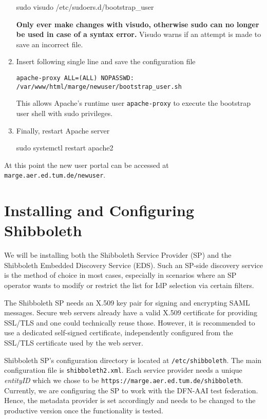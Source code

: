 \begin{enumerate}
\begin{terminal}
        sudo visudo /etc/sudoers.d/bootstrap_user
    \end{terminal}
    \textbf{Only ever make changes with visudo, otherwise sudo can no longer be
    used in case of a syntax error.} Visudo warns if an attempt is made to save
    an incorrect file.
    \item Insert following single line and save the configuration file
    \begin{lstlisting}[frame={l}]
        apache-proxy ALL=(ALL) NOPASSWD: /var/www/html/marge/newuser/bootstrap_user.sh
    \end{lstlisting}
    This allows Apache's runtime user \texttt{apache-proxy} to execute the
    bootstrap user shell with sudo privileges.
    \item Finally, restart Apache server
    \begin{terminal}
        sudo systemctl restart apache2
    \end{terminal}
\end{enumerate}

At this point the new user portal can be accessed at
\texttt{marge.aer.ed.tum.de/newuser}.

\section{Installing and Configuring Shibboleth}\label{section:shibboleth}

We will be installing both the Shibboleth Service Provider (SP) and the
Shibboleth Embedded Discovery Service (EDS). Such an SP-side discovery service
is the method of choice in most cases, especially in scenarios where an SP
operator wants to modify or restrict the list for IdP selection via certain
filters. 

The Shibboleth SP needs an X.509 key pair for signing and encrypting SAML
messages. Secure web servers already have a valid X.509 certificate for
providing SSL/TLS and one could technically reuse those. However, it is
recommended to use a dedicated self-signed certificate, independently configured
from the SSL/TLS certificate used by the web server.

Shibboleth SP's configuration directory is located at \texttt{/etc/shibboleth}.
The main configuration file is \texttt{shibboleth2.xml}. Each service provider
needs a unique \textit{entityID} which we chose to be
\texttt{https://marge.aer.ed.tum.de/shibboleth}. Currently, we are configuring
the SP to work with the DFN-AAI test federation. Hence, the metadata provider is
set accordingly and needs to be changed to the productive version once the
functionality is tested.


